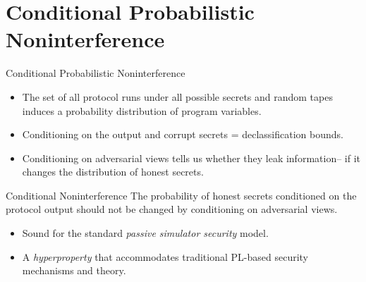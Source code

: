 \documentclass{beamer}
\begin{document}
\section{Conditional Probabilistic Noninterference}
\begin{frame}{Conditional Probabilistic Noninterference}

  \begin{itemize}
    \item The set of all protocol runs under all possible secrets and random tapes
      induces a probability distribution of program variables.
    \item Conditioning on the output and corrupt secrets =  declassification
      bounds.
    \item Conditioning on adversarial views tells us whether they leak information--
      if it changes the distribution of honest secrets.
  \end{itemize}
  
  \begin{alertblock}{Conditional Noninterference}
    The probability of honest secrets conditioned on the protocol output
    should not be changed by conditioning on adversarial views. 
  \end{alertblock}

  \begin{itemize}
  \item Sound for the standard \emph{passive simulator security} model.
  \item A \emph{hyperproperty} that accommodates traditional PL-based security
    mechanisms and theory. 
  \end{itemize}
  
\end{frame}
\end{document}
